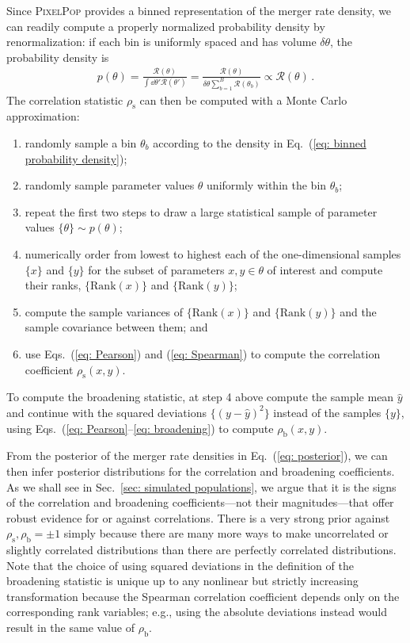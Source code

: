 \documentclass[%
reprint,
 amsmath,amssymb,
 aps,
 prd,nofootinbib,nobibnotes,
 superscriptaddress,groupedaddress,
]{revtex4-2}
\begin{document}
Since \textsc{PixelPop} provides a binned representation of the merger rate density, we can readily compute a properly normalized probability density by renormalization: if each bin is uniformly spaced and has volume $\delta\theta$, the probability density is
\begin{align}
p(\theta)
=
\frac{ \mathcal{R}(\theta) }{ \int \dd{\theta'} \mathcal{R}(\theta') }
=
\frac{ \mathcal{R}(\theta) }{ \delta\theta \sum_{b=1}^B \mathcal{R}(\theta_b) }
\propto
\mathcal{R}(\theta)
\, .
\label{eq: binned probability density}
\end{align}
The correlation statistic $\rho_\mathrm{s}$ can then be computed with a Monte Carlo approximation:
\begin{enumerate}
\item randomly sample a bin $\theta_b$ according to the density in Eq.~(\ref{eq: binned probability density});
\item randomly sample parameter values $\theta$ uniformly within the bin $\theta_b$;
\item repeat the first two steps to draw a large statistical sample of parameter values $\{\theta\} \sim p(\theta)$;
\item numerically order from lowest to highest each of the one-dimensional samples $\{x\}$ and $\{y\}$ for the subset of parameters $x,y\in\theta$ of interest and compute their ranks, $\{\mathrm{Rank}(x)\}$ and $\{\mathrm{Rank}(y)\}$;
\item compute the sample variances of $\{\mathrm{Rank}(x)\}$ and $\{\mathrm{Rank}(y)\}$ and the sample covariance between them; and
\item use Eqs.~(\ref{eq: Pearson}) and (\ref{eq: Spearman}) to compute the correlation coefficient $\rho_\mathrm{s}(x,y)$.
\end{enumerate}
To compute the broadening statistic, at step 4 above compute the sample mean $\hat{y}$ and continue with the squared deviations $\{(y-\hat{y})^2\}$ instead of the samples $\{y\}$, using Eqs.~(\ref{eq: Pearson}--\ref{eq: broadening}) to compute $\rho_\mathrm{b}(x,y)$.

From the posterior of the merger rate densities in Eq.~(\ref{eq: posterior}), we can then infer posterior distributions for the correlation and broadening coefficients. As we shall see in Sec.~\ref{sec: simulated populations}, we argue that it is the signs of the correlation and broadening coefficients---not their magnitudes---that offer robust evidence for or against correlations. There is a very strong prior against $\rho_\mathrm{s},\rho_\mathrm{b}=\pm1$ simply because there are many more ways to make uncorrelated or slightly correlated distributions than there are perfectly correlated distributions. Note that the choice of using squared deviations in the definition of the broadening statistic is unique up to any nonlinear but strictly increasing transformation because the Spearman correlation coefficient depends only on the corresponding rank variables; e.g., using the absolute deviations instead would result in the same value of $\rho_\mathrm{b}$.
\end{document}

